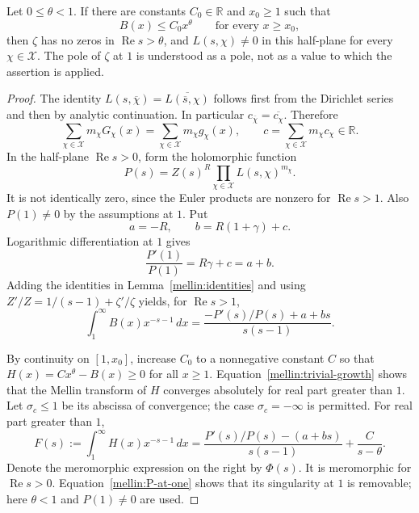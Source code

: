 \begin{theorem}\label{mellin:one-sided-family}
Let $0\leq\theta<1$.  If there are constants $C_0\in\mathbb R$ and
$x_0\geq1$ such that
\begin{equation}\label{mellin:global-bound}
 B(x)\leq C_0x^\theta\qquad\text{for every }x\geq x_0,
\end{equation}
then $\zeta$ has no zeros in $\operatorname{Re}s>\theta$, and
$L(s,\chi)\neq0$ in this half-plane for every
$\chi\in\mathcal X$.  The pole of $\zeta$ at $1$ is understood as a
pole, not as a value to which the assertion is applied.
\end{theorem}

\begin{proof}
The identity
$L(s,\overline\chi)=\overline{L(\overline s,\chi)}$ follows first
from the Dirichlet series and then by analytic continuation.  In
particular $c_{\overline\chi}=\overline{c_\chi}$.  Therefore
\[
 \sum_{\chi\in\mathcal X}m_\chi G_\chi(x)
   =\sum_{\chi\in\mathcal X}m_\chi g_\chi(x),
 \qquad
 c=\sum_{\chi\in\mathcal X}m_\chi c_\chi\in\mathbb R.
\]
In the half-plane $\operatorname{Re}s>0$, form the holomorphic function
\[
 P(s)=Z(s)^R\prod_{\chi\in\mathcal X}L(s,\chi)^{m_\chi}.
\]
It is not identically zero, since the Euler products are nonzero for
$\operatorname{Re}s>1$.  Also $P(1)\neq0$ by the assumptions at $1$.
Put
\[
 a=-R,\qquad b=R(1+\gamma)+c.
\]
Logarithmic differentiation at $1$ gives
\begin{equation}\label{mellin:P-at-one}
 \frac{P'(1)}{P(1)}=R\gamma+c=a+b.
\end{equation}
Adding the identities in Lemma~\ref{mellin:identities} and using
$Z'/Z=1/(s-1)+\zeta'/\zeta$ yields, for
$\operatorname{Re}s>1$,
\begin{equation}\label{mellin:B-transform}
 \int_1^\infty B(x)x^{-s-1}\,dx
   =\frac{-P'(s)/P(s)+a+bs}{s(s-1)}.
\end{equation}

By continuity on $[1,x_0]$, increase $C_0$ to a nonnegative constant
$C$ so that
$H(x)=Cx^\theta-B(x)\geq0$ for all $x\geq1$.
Equation~\eqref{mellin:trivial-growth} shows that the Mellin transform
of $H$ converges absolutely for real part greater than $1$.
Let $\sigma_c\leq1$ be its abscissa of convergence; the case
$\sigma_c=-\infty$ is permitted.  For real part greater than $1$,
\begin{equation}\label{mellin:H-transform}
 F(s):=\int_1^\infty H(x)x^{-s-1}\,dx
   =\frac{P'(s)/P(s)-(a+bs)}{s(s-1)}+\frac C{s-\theta}.
\end{equation}
Denote the meromorphic expression on the right by $\Phi(s)$.
It is meromorphic for $\operatorname{Re}s>0$.
Equation~\eqref{mellin:P-at-one} shows that its singularity at $1$ is
removable; here $\theta<1$ and $P(1)\neq0$ are used.


\end{proof}
